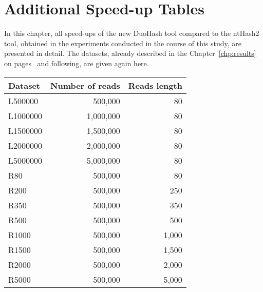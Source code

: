 \chapter{Additional Speed-up Tables}
\label{chp:additional-speedup-tables}


In this chapter, all speed-ups of the new DuoHash tool compared to the ntHash2 tool, obtained in the experiments conducted in the course of this study, are presented in detail. The datasets, already described in the Chapter~\ref{chp:results} on pages~\pageref{subsec:dataset} and following, are given again here.

\begin{table}[!ht]
	\centering
	\begin{tabular}{l r r}
		\textbf{Dataset} & \textbf{Number of reads} & \textbf{Reads length} \\
		\toprule
		L500000 & 500,000 & 80 \\
		L1000000 & 1,000,000 & 80 \\
		L1500000 & 1,500,000 & 80 \\
		L2000000 & 2,000,000 & 80 \\
		L5000000 & 5,000,000 & 80 \\
		\midrule
		R80 & 500,000 & 80 \\
		R200 & 500,000 & 250 \\
		R350 & 500,000 & 350 \\
		R500 & 500,000 & 500 \\
		R1000 & 500,000 & 1,000 \\
		R1500 & 500,000 & 1,500 \\
		R2000 & 500,000 & 2,000 \\
		R5000 & 500,000 & 5,000 \\
		\bottomrule
	\end{tabular}
\end{table}
\clearpage




